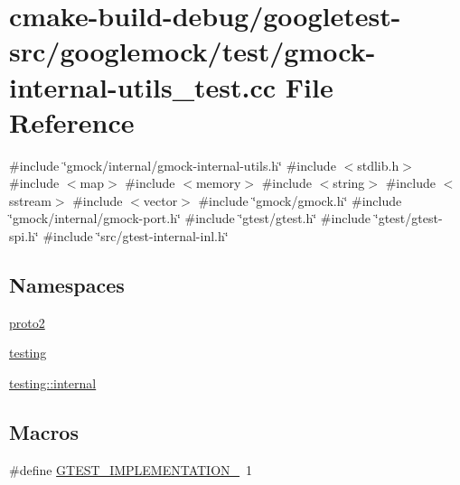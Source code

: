 \hypertarget{gmock-internal-utils__test_8cc}{}\section{cmake-\/build-\/debug/googletest-\/src/googlemock/test/gmock-\/internal-\/utils\+\_\+test.cc File Reference}
\label{gmock-internal-utils__test_8cc}
{\ttfamily \#include \char`\"{}gmock/internal/gmock-\/internal-\/utils.\+h\char`\"{}}\newline
{\ttfamily \#include $<$stdlib.\+h$>$}\newline
{\ttfamily \#include $<$map$>$}\newline
{\ttfamily \#include $<$memory$>$}\newline
{\ttfamily \#include $<$string$>$}\newline
{\ttfamily \#include $<$sstream$>$}\newline
{\ttfamily \#include $<$vector$>$}\newline
{\ttfamily \#include \char`\"{}gmock/gmock.\+h\char`\"{}}\newline
{\ttfamily \#include \char`\"{}gmock/internal/gmock-\/port.\+h\char`\"{}}\newline
{\ttfamily \#include \char`\"{}gtest/gtest.\+h\char`\"{}}\newline
{\ttfamily \#include \char`\"{}gtest/gtest-\/spi.\+h\char`\"{}}\newline
{\ttfamily \#include \char`\"{}src/gtest-\/internal-\/inl.\+h\char`\"{}}\newline
\subsection*{Namespaces}
\begin{DoxyCompactItemize}
\item 
 \mbox{\hyperlink{namespaceproto2}{proto2}}
\item 
 \mbox{\hyperlink{namespacetesting}{testing}}
\item 
 \mbox{\hyperlink{namespacetesting_1_1internal}{testing\+::internal}}
\end{DoxyCompactItemize}
\subsection*{Macros}
\begin{DoxyCompactItemize}
\item 
\#define \mbox{\hyperlink{gmock-internal-utils__test_8cc_a83bd232fd1077579fada92c31bb7469f}{G\+T\+E\+S\+T\+\_\+\+I\+M\+P\+L\+E\+M\+E\+N\+T\+A\+T\+I\+O\+N\+\_\+}}~1
\end{DoxyCompactItemize}


